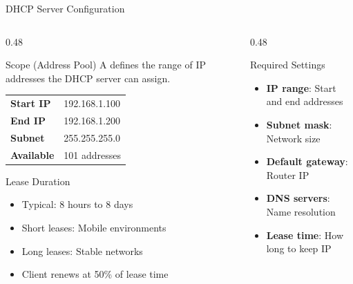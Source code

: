 \documentclass[aspectratio=169]{beamer}  %
\begin{document}
\begin{frame}{DHCP Server Configuration}
    \begin{columns}[T]
        \begin{column}{0.48\textwidth}
            \begin{block}{Scope (Address Pool)}
                \small
                A  defines the range of IP addresses the DHCP server can assign.
                
                \vspace{0.2em}
                \begin{tabular}{l l}
                    \textbf{Start IP} & 192.168.1.100 \\
                    \textbf{End IP} & 192.168.1.200 \\
                    \textbf{Subnet} & 255.255.255.0 \\
                    \textbf{Available} & 101 addresses \\
                \end{tabular}
            \end{block}
            
            \vspace{0.2em}
            \begin{block}{Lease Duration}
                \small
                \begin{itemize}\setlength{\itemsep}{1pt}
                    \item Typical: 8 hours to 8 days
                    \item Short leases: Mobile environments
                    \item Long leases: Stable networks
                    \item Client renews at 50\% of lease time
                \end{itemize}
            \end{block}
        \end{column}
        \begin{column}{0.48\textwidth}
            \begin{block}{Required Settings}
                \small
                \begin{itemize}\setlength{\itemsep}{2pt}
                    \item \textbf{IP range}: Start and end addresses
                    \item \textbf{Subnet mask}: Network size
                    \item \textbf{Default gateway}: Router IP
                    \item \textbf{DNS servers}: Name resolution
                    \item \textbf{Lease time}: How long to keep IP
                \end{itemize}
            \end{block}
            

\end{column}
\end{columns}
\end{frame}
\end{document}

